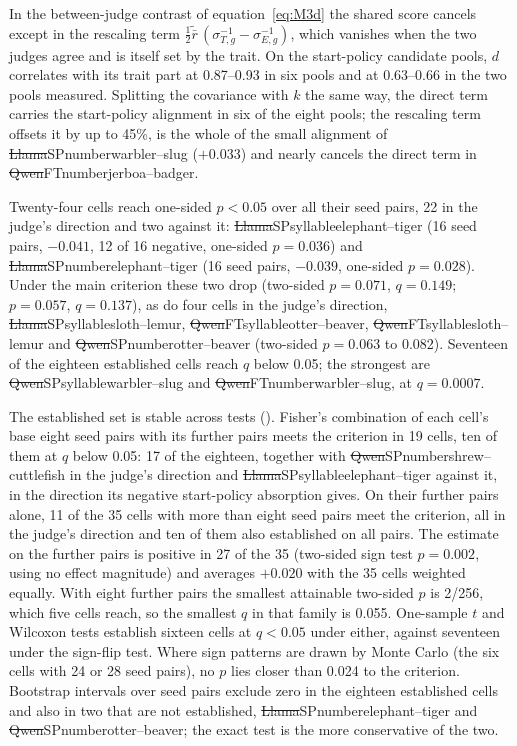 

In the between-judge contrast of equation~\eqref{eq:M3d} the shared score cancels except in the rescaling term $\tfrac12\widetilde{\bar r}\,(\sigma_{T,g}^{-1}-\sigma_{E,g}^{-1})$, which vanishes when the two judges agree and is itself set by the trait. On the start-policy candidate pools, $d$ correlates with its trait part at 0.87--0.93 in six pools and at 0.63--0.66 in the two  pools measured. Splitting the covariance with $k$ the same way, the direct term carries the start-policy alignment in six of the eight pools; the rescaling term offsets it by up to 45\%, is the whole of the small alignment of \st{Llama}{SP}{number}{warbler--slug} ($+0.033$) and nearly cancels the direct term in \st{Qwen}{FT}{number}{jerboa--badger}.


Twenty-four cells reach one-sided $p < 0.05$ over all their seed pairs, 22 in the judge's direction and two against it: \st{Llama}{SP}{syllable}{elephant--tiger} (16 seed pairs, $-0.041$, 12 of 16 negative, one-sided $p = 0.036$) and \st{Llama}{SP}{number}{elephant--tiger} (16 seed pairs, $-0.039$, one-sided $p = 0.028$). Under the main criterion these two drop (two-sided $p = 0.071$, $q = 0.149$; $p = 0.057$, $q = 0.137$), as do four cells in the judge's direction, \st{Llama}{SP}{syllable}{sloth--lemur}, \st{Qwen}{FT}{syllable}{otter--beaver}, \st{Qwen}{FT}{syllable}{sloth--lemur} and \st{Qwen}{SP}{number}{otter--beaver} (two-sided $p = 0.063$ to 0.082). Seventeen of the eighteen established cells reach $q$ below 0.05; the strongest are \st{Qwen}{SP}{syllable}{warbler--slug} and \st{Qwen}{FT}{number}{warbler--slug}, at $q = 0.0007$.

The established set is stable across tests (\edtab{\ref{tab:ed-further}}). Fisher's combination of each cell's base eight seed pairs with its further pairs meets the criterion in 19 cells, ten of them at $q$ below 0.05: 17 of the eighteen, together with \st{Qwen}{SP}{number}{shrew--cuttlefish} in the judge's direction and \st{Llama}{SP}{syllable}{elephant--tiger} against it, in the direction its negative start-policy absorption gives. On their further pairs alone, 11 of the 35 cells with more than eight seed pairs meet the criterion, all in the judge's direction and ten of them also established on all pairs. The estimate on the further pairs is positive in 27 of the 35 (two-sided sign test $p = 0.002$, using no effect magnitude) and averages $+0.020$ with the 35 cells weighted equally. With eight further pairs the smallest attainable two-sided $p$ is 2/256, which five cells reach, so the smallest $q$ in that family is 0.055. One-sample $t$ and Wilcoxon tests establish sixteen cells at $q < 0.05$ under either, against seventeen under the sign-flip test. Where sign patterns are drawn by Monte Carlo (the six cells with 24 or 28 seed pairs), no $p$ lies closer than 0.024 to the criterion. Bootstrap intervals over seed pairs exclude zero in the eighteen established cells and also in two that are not established, \st{Llama}{SP}{number}{elephant--tiger} and \st{Qwen}{SP}{number}{otter--beaver}; the exact test is the more conservative of the two.


